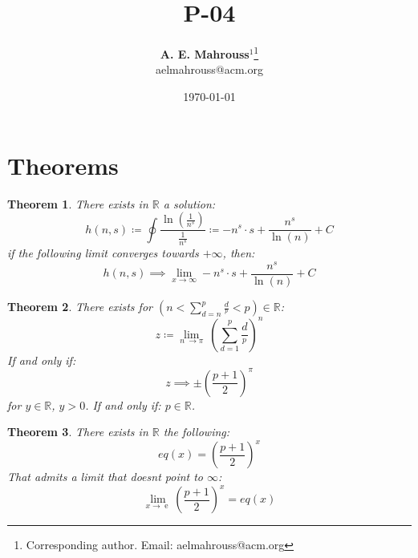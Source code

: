 \documentclass[10pt, twocolumn]{article}
\title{%
  \vspace{-1.5em}%
  \large\textbf{P-04}%
}
\author{%
  \textbf{A. E. Mahrouss}$^{1}$\thanks{Corresponding author. Email: aelmahrouss@acm.org}
  \\aelmahrouss@acm.org\\[0.4em]
}
\date{%
  \small \today
}
\theoremstyle{plain}
\newtheorem{theorem}{Theorem}[section]
\theoremstyle{definition}
\theoremstyle{remark}
\begin{document}

\twocolumn[{%
  \maketitle
  \vspace{-0.5em}
  \vspace{0.8em}
  \rule{\linewidth}{0.4pt}
  \vspace{1em}
}]


\section{Theorems}
\begin{theorem}
  There exists in $\mathbb{R}$ a solution:
  \begin{equation}
    h(n, s) \coloneqq \oint \frac{\ln(\frac{1}{n^s})}{\frac{1}{n^s}}  \coloneq -n^s \cdot s+\frac{n^s}{\ln \left(n\right)}+C
  \end{equation}
  if the following limit converges towards $+\infty$, then:
  \begin{equation}
    h(n, s) \implies \lim _{x\to \infty } -n^s \cdot s+\frac{n^s}{\ln \left(n\right)}+C
  \end{equation}
\end{theorem}

\begin{theorem}
  There exists for $(n < \sum_{d=n}^{p} \frac{d}{^p} < p) \in \mathbb{R}$:
  \begin{equation}
    z \coloneq \lim _{n\:\to \pi }\:(\sum_{d=1}^{p} \frac{d}{^p})^{n}
  \end{equation}
  If and only if:
  \begin{equation}
    z \implies \pm \left(\frac{p+1}{2}\right)^{\pi }
  \end{equation}
  for $y \in \mathbb{R}$, $y > 0$. If and only if: $p \in \mathbb{R}$.
\end{theorem}

\begin{theorem}
  There exists  in $\mathbb{R}$ the following:
  \begin{equation}
    eq(x) = \left(\frac{p+1}{2}\right)^{x}
  \end{equation}
  That admits a limit that doesnt point to $\infty$:
  \begin{equation}
    \lim_{x \to \operatorname{e}} \left(\frac{p+1}{2}\right)^{x } = eq(x)
  \end{equation}
\end{theorem}
\end{document}
